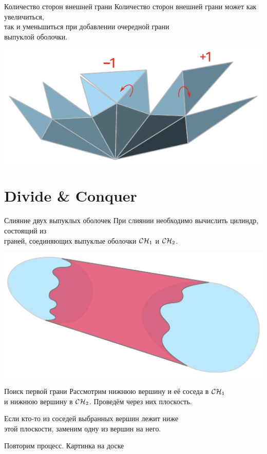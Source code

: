 \begin{frame}{Количество сторон внешней грани}
	Количество сторон внешней грани может как увеличиться, \\
	так и уменьшиться при добавлении очередной грани \\
	выпуклой оболочки.
\begin{center} \includegraphics[scale=0.92]{svg/giftWrapping} \end{center}
\end{frame}


\section{Divide \& Conquer}

\begin{frame}{Слияние двух выпуклых оболочек}
	При слиянии необходимо вычислить цилиндр, состоящий из \\
	граней, соединяющих выпуклые оболочки \(\mathcal{C}\mathcal{H}_1\) и \(\mathcal{C}\mathcal{H}_2\).
\begin{center} \includegraphics[scale=1.04]{svg/CHconquer} \end{center}
\end{frame}


\begin{frame}{Поиск первой грани}
	Рассмотрим нижнюю вершину и её соседа в \(\mathcal{C}\mathcal{H}_1\) \\
	и нижнюю вершину в \(\mathcal{C}\mathcal{H}_2\). Проведём через них плоскость.

	Если кто-то из соседей выбранных вершин лежит ниже \\
	этой плоскости, заменим одну из вершин на него.

	Повторим процесс.\hspace{2.5cm}
	{\footnotesize \textcolor{white!46!dgray}{Картинка на доске}}
\end{frame}


